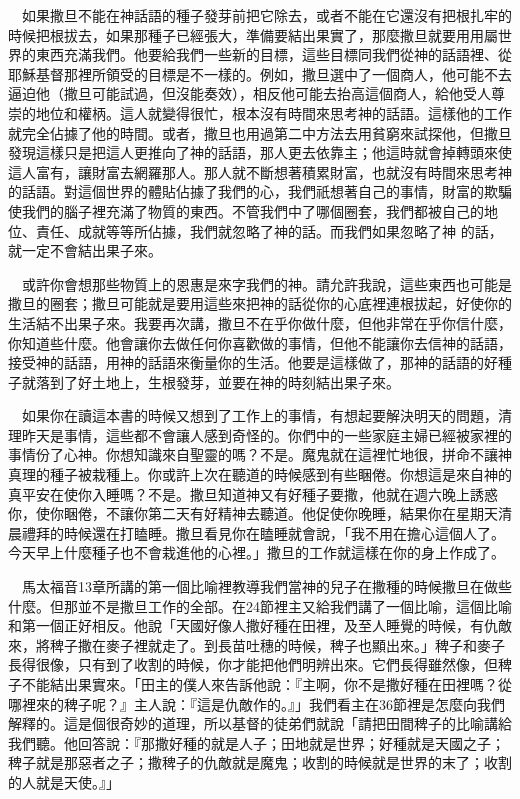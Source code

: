 \documentclass{book}
\begin{document}
　如果撒旦不能在神話語的種子發芽前把它除去，或者不能在它還沒有把根扎牢的時候把根拔去，如果那種子已經張大，準備要結出果實了，那麼撒旦就要用用屬世界的東西充滿我們。他要給我們一些新的目標，這些目標同我們從神的話語裡、從耶穌基督那裡所領受的目標是不一樣的。例如，撒旦選中了一個商人，他可能不去逼迫他（撒旦可能試過，但沒能奏效），相反他可能去抬高這個商人，給他受人尊崇的地位和權柄。這人就變得很忙，根本沒有時間來思考神的話語。這樣他的工作就完全佔據了他的時間。或者，撒旦也用過第二中方法去用貧窮來試探他，但撒旦發現這樣只是把這人更推向了神的話語，那人更去依靠主；他這時就會掉轉頭來使這人富有，讓財富去網羅那人。那人就不斷想著積累財富，也就沒有時間來思考神的話語。對這個世界的體貼佔據了我們的心，我們祇想著自己的事情，財富的欺騙使我們的腦子裡充滿了物質的東西。不管我們中了哪個圈套，我們都被自己的地位、責任、成就等等所佔據，我們就忽略了神的話。而我們如果忽略了神 的話，就一定不會結出果子來。

　或許你會想那些物質上的恩惠是來字我們的神。請允許我說，這些東西也可能是撒旦的圈套；撒旦可能就是要用這些來把神的話從你的心底裡連根拔起，好使你的生活結不出果子來。我要再次講，撒旦不在乎你做什麼，但他非常在乎你信什麼，你知道些什麼。他會讓你去做任何你喜歡做的事情，但他不能讓你去信神的話語，接受神的話語，用神的話語來衡量你的生活。他要是這樣做了，那神的話語的好種子就落到了好土地上，生根發芽，並要在神的時刻結出果子來。

　如果你在讀這本書的時候又想到了工作上的事情，有想起要解決明天的問題，清理昨天是事情，這些都不會讓人感到奇怪的。你們中的一些家庭主婦已經被家裡的事情份了心神。你想知識來自聖靈的嗎？不是。魔鬼就在這裡忙地很，拼命不讓神真理的種子被栽種上。你或許上次在聽道的時候感到有些睏倦。你想這是來自神的真平安在使你入睡嗎？不是。撒旦知道神又有好種子要撒，他就在週六晚上誘惑你，使你睏倦，不讓你第二天有好精神去聽道。他促使你晚睡，結果你在星期天清晨禮拜的時候還在打瞌睡。撒旦看見你在瞌睡就會說，「我不用在擔心這個人了。今天早上什麼種子也不會栽進他的心裡。」撒旦的工作就這樣在你的身上作成了。

　馬太福音13章所講的第一個比喻裡教導我們當神的兒子在撒種的時候撒旦在做些什麼。但那並不是撒旦工作的全部。在24節裡主又給我們講了一個比喻，這個比喻和第一個正好相反。他說「天國好像人撒好種在田裡，及至人睡覺的時候，有仇敵來，將稗子撒在麥子裡就走了。到長苗吐穗的時候，稗子也顯出來。」稗子和麥子長得很像，只有到了收割的時候，你才能把他們明辨出來。它們長得雖然像，但稗子不能結出果實來。「田主的僕人來告訴他說：『主啊，你不是撒好種在田裡嗎？從哪裡來的稗子呢？』主人說：『這是仇敵作的。』」我們看主在36節裡是怎麼向我們解釋的。這是個很奇妙的道理，所以基督的徒弟們就說「請把田間稗子的比喻講給我們聽。他回答說：『那撒好種的就是人子；田地就是世界；好種就是天國之子；稗子就是那惡者之子；撒稗子的仇敵就是魔鬼；收割的時候就是世界的末了；收割的人就是天使。』」
\end{document}

